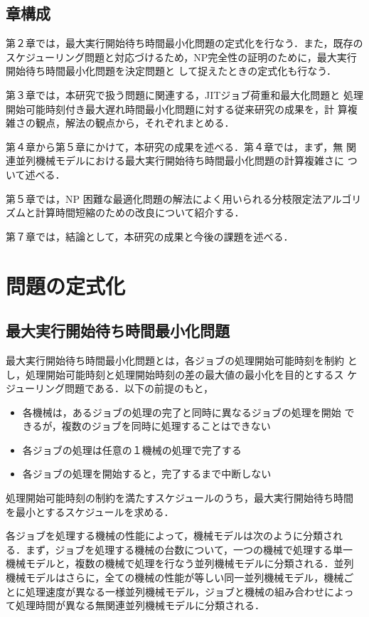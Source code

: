 \documentclass[12pt]{optlab-bachelor}
\begin{document}
\section{章構成}
第２章では，最大実行開始待ち時間最小化問題の定式化を行なう．また，既存のスケジューリング問題と対応づけるため，NP完全性の証明のために，最大実行開始待ち時間最小化問題を決定問題と
して捉えたときの定式化も行なう．

第３章では，本研究で扱う問題に関連する，JITジョブ荷重和最大化問題と
処理開始可能時刻付き最大遅れ時間最小化問題に対する従来研究の成果を，計
算複雑さの観点，解法の観点から，それぞれまとめる．

第４章から第５章にかけて，本研究の成果を述べる．第４章では，まず，無
関連並列機械モデルにおける最大実行開始待ち時間最小化問題の計算複雑さに
ついて述べる．

第５章では，NP 困難な最適化問題の解法によく用いられる分枝限定法アルゴリズムと計算時間短縮のための改良について紹介する．

第７章では，結論として，本研究の成果と今後の課題を述べる．

\chapter{問題の定式化}
\section{最大実行開始待ち時間最小化問題}
最大実行開始待ち時間最小化問題とは，各ジョブの処理開始可能時刻を制約
とし，処理開始可能時刻と処理開始時刻の差の最大値の最小化を目的とするス
ケジューリング問題である．以下の前提のもと，
\begin{itemize}
  \item 各機械は，あるジョブの処理の完了と同時に異なるジョブの処理を開始
  できるが，複数のジョブを同時に処理することはできない
  \item 各ジョブの処理は任意の１機械の処理で完了する
  \item 各ジョブの処理を開始すると，完了するまで中断しない
\end{itemize}
処理開始可能時刻の制約を満たすスケジュールのうち，最大実行開始待ち時間
を最小とするスケジュールを求める．

各ジョブを処理する機械の性能によって，機械モデルは次のように分類され
る．まず，ジョブを処理する機械の台数について，一つの機械で処理する単一
機械モデルと，複数の機械で処理を行なう並列機械モデルに分類される．並列
機械モデルはさらに，全ての機械の性能が等しい同一並列機械モデル，機械ご
とに処理速度が異なる一様並列機械モデル，ジョブと機械の組み合わせによっ
て処理時間が異なる無関連並列機械モデルに分類される．
\end{document}
